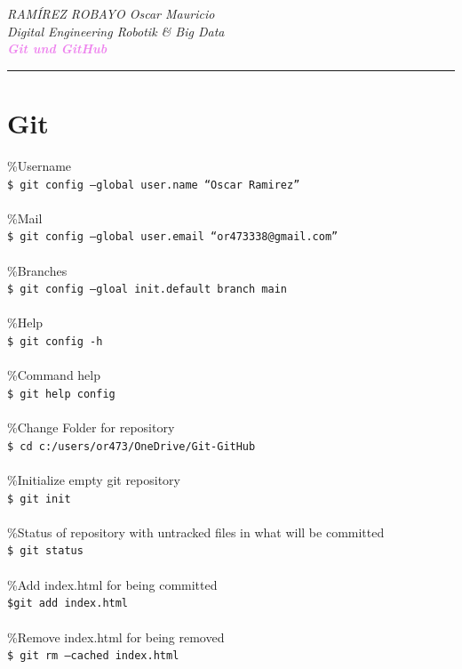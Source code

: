 \documentclass[10pt, a4paper,ngerman]{article}
\let\oldtextbf\textbf
\renewcommand{\textbf}[1]{\textcolor{violet}{\oldtextbf{#1}}}
\begin{document}
\thispagestyle{empty}

\begin{flushleft}
  \textit{RAMÍREZ ROBAYO Oscar Mauricio}
  \\
  \textit{Digital Engineering Robotik \& Big Data}
  \\
  \textcolor{blue}{\textbf{\textit{Git und GitHub}}}
  \\
  \textcolor{violet}{{\rule{\paperwidth/2}{1pt}}}
\end{flushleft}
\section{Git}
\%Username\\
\texttt{\$ git config --global user.name ``Oscar Ramirez''}\\\\
\%Mail\\
\texttt{\$ git config --global user.email ``or473338@gmail.com''}\\\\
\%Branches\\
\texttt{\$ git config --gloal init.default branch main}\\\\
\%Help \\
\texttt{\$ git config -h}\\\\
\%Command help\\
\texttt{\$ git help config}\\\\
\%Change Folder for repository\\
\texttt{\$ cd c:/users/or473/OneDrive/Git-GitHub}\\\\
\%Initialize empty git repository\\
\texttt{\$ git init}\\\\
\%Status of repository with untracked files in what will be committed\\
\texttt{\$ git status}\\\\
\%Add index.html for being committed\\
\texttt{\$git add index.html}\\\\
\%Remove index.html for being removed\\
\texttt{\$ git rm --cached index.html}\\\\
\end{document}
